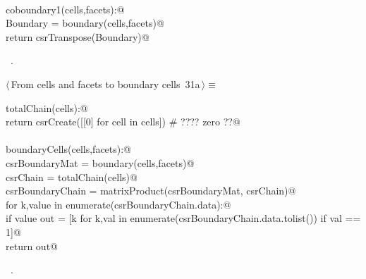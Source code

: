 \documentclass[11pt,oneside]{article}    %
\begin{document}
\begin{flushleft}
\begin{list}{}{}
\mbox{}\verb@@\\
\mbox{}\verb@def coboundary1(cells,facets):@\\
\mbox{}\verb@    Boundary = boundary(cells,facets)@\\
\mbox{}\verb@    return csrTranspose(Boundary)@\\
\mbox{}\verb@@{\NWsep}
\end{list}
\vspace{-1ex}
\footnotesize\addtolength{\baselineskip}{-1ex}
\begin{list}{}{\setlength{\itemsep}{-\parsep}\setlength{\itemindent}{-\leftmargin}}
\item \NWtxtMacroRefIn\ .
\end{list}
\end{flushleft}
\begin{flushleft} \small \label{scrap50}
\protect{}$\langle\,$From cells and facets to boundary cells\nobreak\ {\footnotesize 31a}$\,\rangle\equiv$
\vspace{-1ex}
\begin{list}{}{} \item
\mbox{}\verb@def totalChain(cells):@\\
\mbox{}\verb@    return csrCreate([[0] for cell in cells])  # ????  zero ??@\\
\mbox{}\verb@@\\
\mbox{}\verb@def boundaryCells(cells,facets):@\\
\mbox{}\verb@    csrBoundaryMat = boundary(cells,facets)@\\
\mbox{}\verb@    csrChain = totalChain(cells)@\\
\mbox{}\verb@    csrBoundaryChain = matrixProduct(csrBoundaryMat, csrChain)@\\
\mbox{}\verb@    for k,value in enumerate(csrBoundaryChain.data):@\\
\mbox{}\verb@        if value % 2 == 0: csrBoundaryChain.data[k] = 0@\\
\mbox{}\verb@    out = [k for k,val in enumerate(csrBoundaryChain.data.tolist()) if val == 1]@\\
\mbox{}\verb@    return out@\\
\mbox{}\verb@@{\NWsep}
\end{list}
\vspace{-1ex}
\footnotesize\addtolength{\baselineskip}{-1ex}
\begin{list}{}{\setlength{\itemsep}{-\parsep}\setlength{\itemindent}{-\leftmargin}}
\item \NWtxtMacroRefIn\ .
\end{list}
\end{flushleft}
\end{document}
